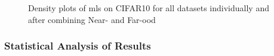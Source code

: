 \documentclass[UKenglish]{uiomasterthesis} %
\theoremstyle{definition}
\begin{document}
\begin{figure}[hbtp]
    \begin{center}
        
    \end{center}
    \caption{Density plots of \acs*{mls} on CIFAR10 for all datasets individually and after combining Near- and Far-\acs*{ood}}
    \label{fig:full_not_full}
\end{figure}

%
%

\subsubsection{Statistical Analysis of Results} \label{section:ttest_methodology}
\end{document}
